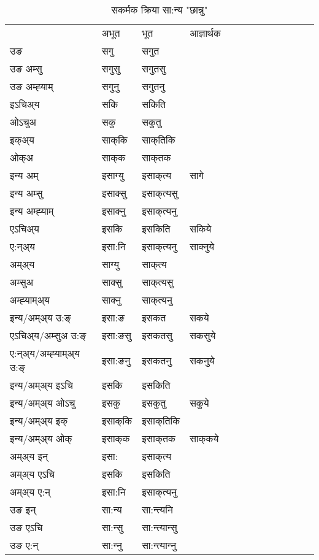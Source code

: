 \begin{table}[H]
\label{ak.vt} \centering
\caption{सकर्मक क्रिया  सा:न्य  "छान्नु"  }
\begin{tabular}{l|l|l|l|l|l|l|l|l|l|l|l|l}  \toprule
&अभूत & भूत & आज्ञार्थक \\ 
उङ &सगु &सगुत \\ 
उङ अम्सु &सगुसु &सगुतसु \\ 
उङ अम्ह्‍याम् &सगुनु &सगुतनु \\ 
इऽचिअ्य &सकि &सकिति   \\ 
ओऽचुअ &सकु &सकुतु   \\ 
इक्अ्य &साक्‌कि &साक्‌तिकि   \\ 
ओक्अ &साक्‌क &साक्‌तक   \\ 
इन्य अम् & इसाग्यु  & इसाक्‌त्य &सागे  \\ 
इन्य अम्सु & इसाक्सु  & इसाक्‌त्यसु   \\ 
इन्य अम्ह्‍याम् & इसाक्‍नु  & इसाक्‌त्यनु   \\ 
एऽचिअ्य & इसकि & इसकिति &सकिये    \\ 
ए:न्अ्य & इसा:नि  & इसाक्‌त्यनु &साक्‍नुये  \\ 
अम्अ्य & साग्यु  & साक्‌त्य  \\ 
अम्सुअ & साक्सु & साक्‌त्यसु  \\ 
अम्ह्‍याम्अ्य & साक्‍नु  & साक्‌त्यनु \\ 
\midrule
इन्य/अम्अ्य उ:ङ्‌&इसा:ङ & इसकत &सकये \\ 
एऽचिअ्य/अम्सुअ उ:ङ्‌ &इसा:ङसु & इसकतसु &सकसुये \\ 
ए:न्अ्य/अम्ह्‍याम्अ्य उ:ङ्‌ &इसा:ङनु & इसकतनु &सकनुये \\ 
इन्य/अम्अ्य इऽचि & इसकि & इसकिति    \\ 
इन्य/अम्अ्य ओऽचु & इसकु & इसकुतु  &सकुये  \\ 
इन्य/अम्अ्य इक् & इसाक्‌कि & इसाक्‌तिकि   \\ 
इन्य/अम्अ्य ओक् & इसाक्‌क & इसाक्‌तक  &साक्‌कये  \\ 
अम्अ्य इन् & इसा: & इसाक्‌त्य   \\ 
अम्अ्य एऽचि & इसकि & इसकिति    \\ 
अम्अ्य ए:न् & इसा:नि  & इसाक्‌त्यनु  \\ 
\midrule
उङ इन् & सा:न्य  & सा:न्त्यनि  \\ 
उङ एऽचि & सा:न्सु  & सा:न्त्यान्सु   \\ 
उङ ए:न्& सा:न्‍नु  & सा:न्त्यान्‍नु   \\ 
\bottomrule
\end{tabular}
\end{table}


